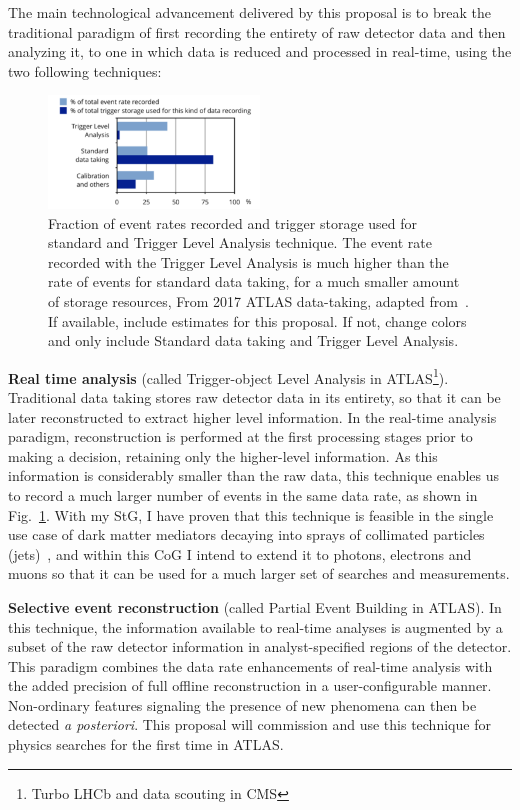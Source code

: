 \documentclass[11pt,a4paper]{article}
\begin{document}
The main technological advancement delivered by this proposal is to break the traditional paradigm of first recording the entirety of raw detector data and then analyzing it, to one in which data is reduced and processed in real-time, using the two following techniques:

\begin{figure} 
\vskip-5pt
\includegraphics[width=0.5\textwidth]{figs/TLAPEB}
\caption{\label{fig:TLAPEB} \small Fraction of event rates recorded and trigger storage used for standard and Trigger Level Analysis technique. 
The event rate recorded with the Trigger Level Analysis is much higher than the rate of events for standard data taking, for a much smaller amount of storage resources, From 2017 ATLAS data-taking, adapted from~\cite{Computing}. \scriptsize \color{red} If available, include estimates for this proposal. If not, change colors and only include Standard data taking and Trigger Level Analysis. \color{black}}
\end{figure}


\textbf{Real time analysis} (called Trigger-object Level Analysis in ATLAS\footnote{Turbo LHCb and data scouting in CMS}). Traditional data taking stores raw detector data in its entirety, so that it can be later reconstructed to extract higher level information. In the real-time analysis paradigm, reconstruction is performed at the first processing stages prior to making a decision, retaining only the higher-level information. As this information is considerably smaller than the raw data, this technique enables us to record a much larger number of events in the same data rate, as shown in Fig.~\ref{fig:TLAPEB}.  
With my StG, I have proven that this technique is feasible in the single use case of dark matter mediators decaying into sprays of collimated particles (jets)~\cite{PRL_TLA}, and within this CoG I intend to extend it to photons, electrons and muons so that it can be used for a much larger set of searches and measurements. 

\textbf{Selective event reconstruction} (called Partial Event Building in ATLAS). In this technique, the information available to real-time analyses is augmented by a subset of the raw detector information in analyst-specified regions of the detector. This paradigm combines the data rate enhancements of real-time analysis with the added precision of full offline reconstruction in a user-configurable manner. Non-ordinary features signaling the presence of new phenomena can then be detected \textit{a posteriori}. This proposal will commission and use this technique for physics searches for the first time in ATLAS. 
\end{document}
